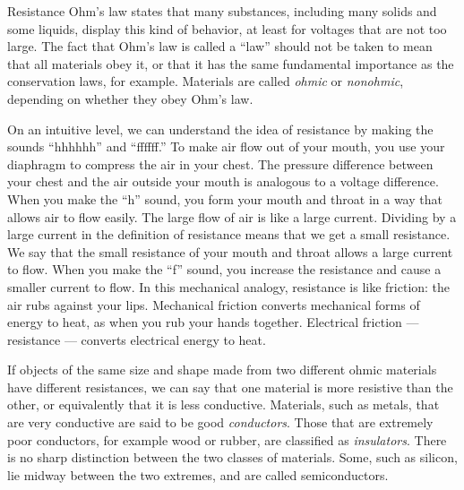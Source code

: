 \begin{envsubsection}{Resistance}
	Ohm's law states that many substances, including many solids
	and some liquids, display this kind of behavior, at least
	for voltages that are not too large. The fact that Ohm's law
	is called a ``law'' should not be taken to mean that all
	materials obey it, or that it has the same fundamental
	importance as the conservation laws, for example. Materials are
	called \emph{ohmic} or \emph{nonohmic},
	depending on whether they obey Ohm's law.

	On an intuitive level, we can understand the idea of
	resistance by making the sounds ``hhhhhh'' and ``ffffff.''
	To make air flow out of your mouth, you use your diaphragm
	to compress the air in your chest. The pressure difference
	between your chest and the air outside your mouth is
	analogous to a voltage difference. When you make the ``h''
	sound, you form your mouth and throat in a way that allows
	air to flow easily. The large flow of air is like a large
	current. Dividing by a large current in the definition of
	resistance means that we get a small resistance. We say that
	the small resistance of your mouth and throat allows a large
	current to flow. When you make the ``f'' sound, you increase
	the resistance and cause a smaller current to flow. In this
	mechanical analogy, resistance is like friction: the air rubs
	against your lips. Mechanical friction converts 
	mechanical forms of energy to heat, as when you rub your
	hands together. Electrical friction --- resistance ---
	converts electrical energy to heat.

	If objects of the same size and shape made from two
	different ohmic materials have different resistances, we can
	say that one material is more resistive than the other, or
	equivalently that it is less conductive. Materials, such as
	metals, that are very conductive are said to be good
	\emph{conductors}. Those that are
	extremely poor conductors, for example wood or rubber, are
	classified as \emph{insulators}. There
	is no sharp distinction between the two classes of
	materials. Some, such as silicon, lie midway between the two
	extremes, and are called semiconductors.
\end{envsubsection}
%
